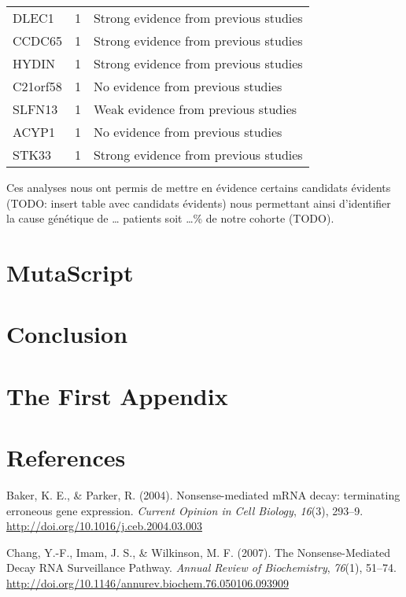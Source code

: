 \documentclass[12pt,twoside]{reedthesis}
\theoremstyle{definition}
\theoremstyle{definition}
\theoremstyle{remark}
\begin{document}
\begin{longtable}[t]{lrl}
  DLEC1 & 1 & Strong evidence from previous studies\\
  \addlinespace
  CCDC65 & 1 & Strong evidence from previous studies\\
  HYDIN & 1 & Strong evidence from previous studies\\
  C21orf58 & 1 & No evidence from previous studies\\
  SLFN13 & 1 & Weak evidence from previous studies\\
  ACYP1 & 1 & No evidence from previous studies\\
  STK33 & 1 & Strong evidence from previous studies\\
  \bottomrule
  \end{longtable}
  
  Ces analyses nous ont permis de mettre en évidence certains candidats
  évidents (TODO: insert table avec candidats évidents) nous permettant
  ainsi d'identifier la cause génétique de \ldots{} patients soit
  \ldots{}\% de notre cohorte (TODO).
  
  \chapter{MutaScript}\label{mutascript}
  
  \chapter*{Conclusion}\label{conclusion}
  
  \chapter{The First Appendix}\label{the-first-appendix}
  
  \chapter*{References}\label{references}
  
  \hypertarget{refs}{}
  \hypertarget{ref-Baker2004}{}
  Baker, K. E., \& Parker, R. (2004). Nonsense-mediated mRNA decay:
  terminating erroneous gene expression. \emph{Current Opinion in Cell
  Biology}, \emph{16}(3), 293--9.
  \url{http://doi.org/10.1016/j.ceb.2004.03.003}
  
  \hypertarget{ref-Chang2007}{}
  Chang, Y.-F., Imam, J. S., \& Wilkinson, M. F. (2007). The
  Nonsense-Mediated Decay RNA Surveillance Pathway. \emph{Annual Review of
  Biochemistry}, \emph{76}(1), 51--74.
  \url{http://doi.org/10.1146/annurev.biochem.76.050106.093909}
  
\end{document}

